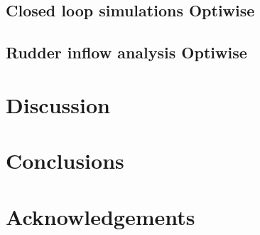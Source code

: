 \documentclass[preprint,9pt,authoryear]{elsarticle}
\begin{document}
\subsection{Closed loop simulations Optiwise}

\FloatBarrier

\subsection{Rudder inflow analysis Optiwise}

\FloatBarrier


\section{Discussion}
\label{sec:discussion}


\section{Conclusions}
\label{sec:conclusions}

\FloatBarrier

\section{Acknowledgements}


\appendix


\FloatBarrier
\pagebreak

%

\end{document}
